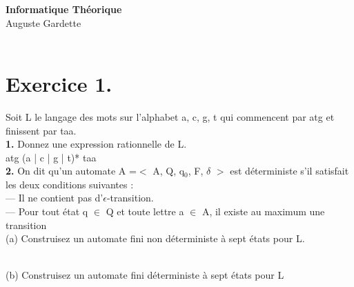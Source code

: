 \documentclass[12pt,a4paper, france]{article}
\newcommand\tab[1][1cm]{\hspace*{#1}}
\begin{document}
\begin{center}
{\textbf {\huge Informatique Théorique}}\\[5mm]
{\large Auguste Gardette} \\[5mm]
{} \\ [5mm]
\end{center}


\section{Exercice 1.}

Soit L le langage des mots sur l’alphabet {a, c, g, t} qui commencent par atg
et finissent par taa. \\

\textbf{1.} Donnez une expression rationnelle de L. \\

\tab atg (a | c | g | t)* taa \\

\textbf{2.} On dit qu\textquoteright un automate A =$<$ A, Q, q${_0}$, F, ${\delta}$ $>$ est d\'eterministe s\textquoteright il satisfait les deux conditions suivantes : \\
\tab — Il ne contient pas d\textquoteright ${\epsilon}$-transition. \\
\tab — Pour tout  \'etat q ${\in}$ Q et toute lettre a ${\in}$ A, il existe au maximum une transition\\

(a) Construisez un automate fini non d\'eterministe \`a sept  \'etats pour L.\\

 \\ [5mm]

(b) Construisez un automate fini d\'eterministe \`a sept  \'etats pour L\\
\end{document}
